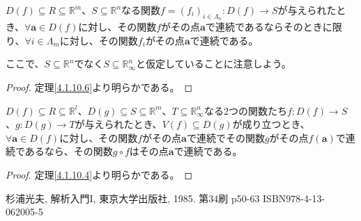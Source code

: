 \documentclass[dvipdfmx]{jsarticle}
\begin{document}
\begin{thm}\label{4.1.10.18}
$D(f) \subseteq R \subseteq \mathbb{R}^{m}$、$S \subseteq \mathbb{R}^{n}$なる関数$f = \left( f_{i} \right)_{i \in \varLambda_{n}}:D(f) \rightarrow S$が与えられたとき、$\forall\mathbf{a} \in D(f)$に対し、その関数$f$がその点$\mathbf{a}$で連続であるならそのときに限り、$\forall i \in \varLambda_{m}$に対し、その関数$f_{i}$がその点$\mathbf{a}$で連続である。\par
ここで、$S \subseteq \mathbb{R}^{n}$でなく$S \subseteq \mathbb{R}_{\infty}^{n}$と仮定していることに注意しよう。
\end{thm}
\begin{proof} 定理\ref{4.1.10.6}より明らかである。
\end{proof}
\begin{thm}\label{4.1.10.19}
$D(f) \subseteq R \subseteq \mathbb{R}^{l}$、$D(g) \subseteq S \subseteq \mathbb{R}^{m}$、$T \subseteq \mathbb{R}_{\infty}^{n}$なる2つの関数たち$f:D(f) \rightarrow S$、$g:D(g) \rightarrow T$が与えられたとき、$V(f) \subseteq D(g)$が成り立つとき、$\forall\mathbf{a} \in D(f)$に対し、その関数$f$がその点$\mathbf{a}$で連続でその関数$g$がその点$f\left( \mathbf{a} \right)$で連続であるなら、その関数$g \circ f$はその点$\mathbf{a}$で連続である。
\end{thm}
\begin{proof} 定理\ref{4.1.10.4}より明らかである。
\end{proof}
\begin{thebibliography}{50}
  杉浦光夫, 解析入門I, 東京大学出版社, 1985. 第34刷 p50-63 ISBN978-4-13-062005-5
\end{thebibliography}
\end{document}
